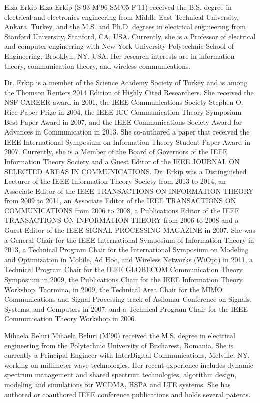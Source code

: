 \documentclass[journal,final,letterpaper,10pt,doublecolumn,twoside]{IEEEtran}
\begin{document}
\begin{IEEEbiography}{Elza Erkip}
Elza Erkip (S'93-M'96-SM'05-F'11) received the B.S. degree in electrical and electronics engineering from Middle East Technical University, Ankara, Turkey, and the M.S. and Ph.D. degrees in electrical engineering from Stanford University, Stanford, CA, USA. Currently, she is a Professor of electrical and computer engineering with New York University Polytechnic School of Engineering, Brooklyn, NY, USA. Her research interests are in information theory, communication theory, and wireless communications.

Dr. Erkip is a member of the Science Academy Society of Turkey and is among the Thomson Reuters 2014 Edition of Highly Cited Researchers. She received the NSF CAREER award in 2001, the IEEE Communications Society Stephen O. Rice Paper Prize in 2004, the IEEE ICC Communication Theory Symposium Best Paper Award in 2007, and the IEEE Communications Society Award for Advances in Communication in 2013. She co-authored a paper that received the IEEE International Symposium on Information Theory Student Paper Award in 2007. Currently, she is a Member of the Board of Governors of the IEEE Information Theory Society and a Guest Editor of the IEEE JOURNAL ON SELECTED AREAS IN COMMUNICATIONS. Dr. Erkip was a Distinguished Lecturer of the IEEE Information Theory Society from 2013 to 2014, an Associate Editor of the IEEE TRANSACTIONS ON INFORMATION THEORY from 2009 to 2011, an Associate Editor of the IEEE TRANSACTIONS ON COMMUNICATIONS from 2006 to 2008, a Publications Editor of the IEEE TRANSACTIONS ON INFORMATION THEORY from 2006 to 2008 and a Guest Editor of the IEEE SIGNAL PROCESSING MAGAZINE in 2007. She was a General Chair for the IEEE International Symposium of Information Theory in 2013, a Technical Program Chair for the International Symposium on Modeling and Optimization in Mobile, Ad Hoc, and Wireless Networks (WiOpt) in 2011, a Technical Program Chair for the IEEE GLOBECOM Communication Theory Symposium in 2009, the Publications Chair for the IEEE Information Theory Workshop, Taormina, in 2009, the Technical Area Chair for the MIMO Communications and Signal Processing track of Asilomar Conference on Signals, Systems, and Computers in 2007, and a Technical Program Chair for the IEEE Communication Theory Workshop in 2006.
\end{IEEEbiography}

\begin{IEEEbiography}{Mihaela Beluri}
Mihaela Beluri (M'90) received the M.S. degree in electrical engineering from the Polytechnic University of Bucharest, Romania. She is currently a Principal Engineer with InterDigital Communications, Melville, NY, working on millimeter wave technologies. Her recent experience includes dynamic spectrum management and shared spectrum technologies, algorithm design, modeling and simulations for WCDMA, HSPA and LTE systems. She has authored or coauthored IEEE conference publications and holds several patents.
\end{IEEEbiography}
\end{document}
